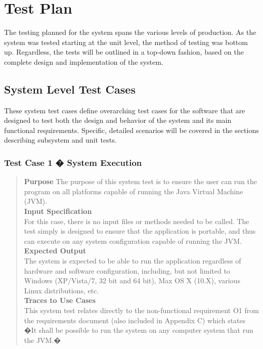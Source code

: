 \documentclass[12pt]{article}
\begin{document}
\section{Test Plan}

{
The testing planned for the system spans the various levels of production. As the system was tested starting at the unit level, the method of testing was bottom up. Regardless, the tests will be outlined in a top-down fashion, based on the complete design and implementation of the system. \\
}

\subsection{System Level Test Cases}
{
These system test cases define overarching test cases for the software that are designed to test both the design and behavior of the system and its main functional requirements. Specific, detailed scenarios will be covered in the sections describing subsystem and unit tests.
}
\subsubsection{Test Case 1 � System Execution}
\begin{quote}
{\bf Purpose}
{
The purpose of this system test is to ensure the user can run the program on all platforms capable of running the Java Virtual Machine (JVM).
}
\\
{\bf Input Specification}
\\
{
For this case, there is no input files or methods needed to be called. The test simply is designed to ensure that the application is portable, and thus can execute on any system configuration capable of running the JVM.
}
\\
{\bf Expected Output}
\\
{
The system is expected to be able to run the application regardless of hardware and software configuration, including, but not limited to Windows (XP/Vista/7, 32 bit and 64 bit), Max OS X (10.X), various Linux distributions, etc.
}
\\
{\bf Traces to Use Cases}
\\
{
This system test relates directly to the non-functional requirement O1 from the requirements document (also included in Appendix C) which states �It shall be possible to run the system on any computer system that run the JVM.�
}
\end{quote}
\end{document}
